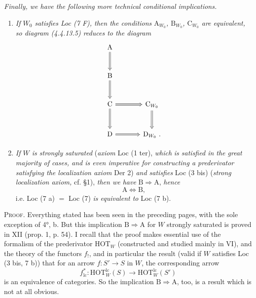 \noindent{}\enspace\textit{Finally, we have the following more technical conditional implications.}
\begin{enumerate}[leftmargin=2.5em]
\item[a)] \textit{If $W_0$ satisfies Loc (7 F), then the conditions $\mathrm{A}_{W_0}$, $\mathrm{B}_{W_0}$, $\mathrm{C}_{W_0}$ are equivalent, so diagram (4.4.13.5) reduces to the diagram}
\[
\begin{tikzcd}[row sep=large, column sep=large]
\mathrm{A} \arrow[d,Rightarrow] & \\
\mathrm{B} \arrow[d,Rightarrow] & \\
\mathrm{C} \arrow[r,Rightarrow] \arrow[d,Rightarrow] & \mathrm{C}_{W_0} \arrow[d,Rightarrow] \\
\mathrm{D} \arrow[r,Rightarrow] & \mathrm{D}_{W_0}\ .
\end{tikzcd}
\]

\item[b)] \textit{If $W$ is strongly saturated} (\textit{axiom} Loc (1 ter), \textit{which}
%
\textit{is satisfied in the great majority of cases, and is even imperative for constructing a prederivator satisfying the localization axiom} Der 2) \textit{and satisfies} Loc (3 bis) (\textit{strong localization axiom,} cf. §1), \textit{then we have} $\mathrm{B}\Longrightarrow\mathrm{A}$, \textit{hence}
\[
\mathrm{A} \iff \mathrm{B},
\]
i.e. Loc (7 a) $=$ Loc (7) \textit{is equivalent to} Loc (7 b).
\end{enumerate}

\noindent\textsc{Proof}. Everything stated has been seen in the preceding pages, with the sole exception of 4°, b. But this implication $\mathrm{B}\Longrightarrow\mathrm{A}$ for $W$ strongly saturated is proved in XII (prop. 1, p. 54). I recall that the proof makes essential use of the %
%
formalism of the prederivator $\mathrm{HOT}_W$ (constructed and studied mainly in VI), and the theory of the functors $f_!$, and in particular the result (valid if $W$ satisfies Loc (3 bis, 7 b)) that for an arrow $f:S'\longrightarrow S$ in $W$, the corresponding arrow
\[
f^*_{\mathrm{lc}}:\mathrm{HOT}^{\mathrm{lc}}_W(S)\longrightarrow\mathrm{HOT}^{\mathrm{lc}}_W(S')
\]
is an equivalence of categories. So the implication $\mathrm{B}\Longrightarrow\mathrm{A}$, too, is a result which is not at all obvious.

